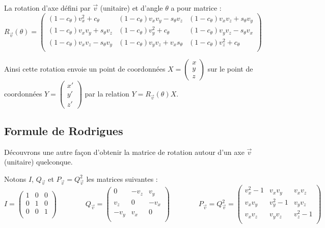\documentclass[11pt,class=report,crop=false]{standalone}
\begin{document}
La rotation d'axe défini par $\vec v$ (unitaire) et d'angle $\theta$ a pour matrice :
$$R_{\vec v}(\theta) = 
\begin{pmatrix}
(1-c_\theta)v_x^2 + c_\theta & (1-c_\theta) v_x v_y - s_\theta v_z & (1-c_\theta) v_x v_z + s_\theta v_y \\
(1-c_\theta) v_x v_y + s_\theta v_z & (1-c_\theta)v_y^2 + c_\theta & (1-c_\theta) v_y v_z - s_\theta v_x \\
 (1-c_\theta) v_x v_z - s_\theta v_y  & (1-c_\theta)v_y v_z + v_x s_\theta & (1-c_\theta)v_z^2 + c_\theta \\
\end{pmatrix}
$$

Ainsi cette rotation envoie un point de coordonnées $X = \left(\begin{smallmatrix} x\\y\\z \end{smallmatrix} \right)$ sur le point de coordonnées $Y = \left(\begin{smallmatrix} x'\\y'\\z' \end{smallmatrix} \right)$ par la relation 
$Y = R_{\vec v}(\theta) X$.

\subsection{Formule de Rodrigues}


Découvrons une autre façon d'obtenir la matrice de rotation autour d'un axe $\vec v$ (unitaire) quelconque.

Notons $I$, $Q_{\vec v}$ et $P_{\vec v} = Q_{\vec v}^2$ les matrices suivantes :
$$
I = \begin{pmatrix}
1 & 0 & 0 \\
0 & 1 & 0 \\
0 & 0 & 1 \\
\end{pmatrix}
\qquad\qquad
Q_{\vec v} = \begin{pmatrix}
0 & -v_z & v_y \\
v_z & 0 & -v_x \\
-v_y & v_x & 0 \\
\end{pmatrix}
\qquad\qquad
P_{\vec v} = Q_{\vec v}^2 =
\begin{pmatrix}
v_x^2-1 & v_x v_y & v_x v_z \\
v_x v_y & v_y^2-1 & v_y v_z \\
v_x v_z & v_y v_z & v_z^2-1 \\
\end{pmatrix} 
$$
\end{document}
